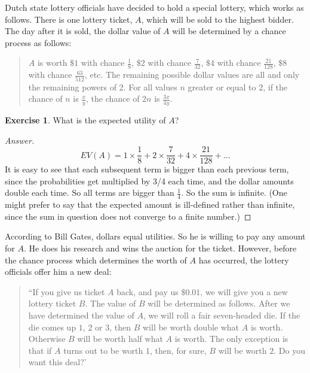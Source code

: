 \documentclass[11pt]{article}
\theoremstyle{definition}
\newtheorem{exer}{Exercise}
\begin{document}
Dutch state lottery officials have decided to hold a special lottery, which works as follows. There is one lottery ticket, $A$, which will be sold to the highest bidder. The day after it is sold, the dollar value of $A$ will be determined by a chance process as follows:

\begin{quote}
$A$ is worth $\$ 1$ with chance $\frac{1}{8}$, $\$ 2$ with chance $\frac{7}{32}$, $\$ 4$ with chance $\frac{21}{128}$, $\$ 8$ with chance $\frac{63}{512}$, etc. The remaining possible dollar values are all and only the remaining powers of 2. For all values $n$ greater or equal to $2$, if the chance of $n$ is $\frac{x}{y}$, the chance of $2n$ is $\frac{3x}{4y}$.
\end{quote}

\begin{exer}
What is the expected utility of $A$?
\end{exer}

\begin{proof}[Answer]
$$EV(A) = 1 \times \frac{1}{8} + 2 \times \frac{7}{32} + 4 \times \frac{21}{128} + ...$$
It is easy to see that each subsequent term is bigger than each previous term, since the probabilities get multiplied by 3/4 each time, and the dollar amounts double each time. So all terms are bigger than $\frac{1}{4}$. So the sum is infinite. (One might prefer to say that the expected amount is ill-defined rather than infinite, since the sum in question does not converge to a finite number.)

\end{proof}

According to Bill Gates, dollars equal utilities. So he is willing to pay any amount for $A$. He does his research and wins the auction for the ticket. However, before the chance process which determines the worth of $A$ has occurred, the lottery officials offer him a new deal:

\begin{quote}
``If you give us ticket $A$ back, and pay us $\$ 0.01$, we will give you a new lottery ticket $B$. The value of $B$ will be determined as follows. After we have determined the value of $A$, we will roll a fair seven-headed die. If the die comes up $1$, $2$ or $3$, then $B$ will be worth double what $A$ is worth. Otherwise $B$ will be worth half what $A$ is worth. The only exception is that if $A$ turns out to be worth $1$, then, for sure, $B$ will be worth $2$. Do you want this deal?'
\end{quote}
\end{document}
